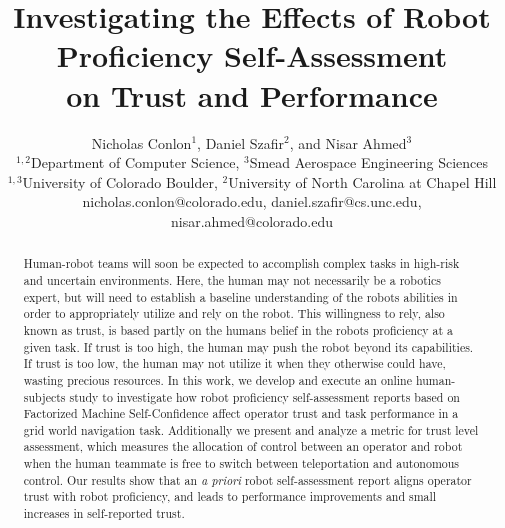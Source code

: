\documentclass[aaai]{article}
\begin{document}
\title{Investigating the Effects of Robot Proficiency Self-Assessment \\ on Trust and Performance}
\author{Nicholas Conlon$^{1}$, Daniel Szafir$^{2}$, and Nisar Ahmed$^{3}$\\
$^{1,2}$Department of Computer Science, $^{3}$Smead Aerospace Engineering Sciences\\
$^{1,3}$University of Colorado Boulder, $^{2}$University of North Carolina at Chapel Hill\\
nicholas.conlon@colorado.edu, daniel.szafir@cs.unc.edu, nisar.ahmed@colorado.edu\\
}
\newcommand{\nickComm}[1]{{\color{red}{ \textbf{NJC:} #1}}}
\newcommand{\brettComm}[1]{{\color{blue}{ \textbf{BWI:} #1}}}
\newcommand{\nisarComm}[1]{{\color{magenta}{ \textbf{NRA:} #1}}}

\maketitle
\thispagestyle{empty}
\pagestyle{empty}



\begin{abstract}
Human-robot teams will soon be expected to accomplish complex tasks in high-risk and uncertain environments. Here, the human may not necessarily be a robotics expert, but will need to establish a baseline understanding of the robots abilities in order to appropriately utilize and rely on the robot. This willingness to rely, also known as trust, is based partly on the humans belief in the robots proficiency at a given task. If trust is too high, the human may push the robot beyond its capabilities. If trust is too low, the human may not utilize it when they otherwise could have, wasting precious resources. In this work, we develop and execute an online human-subjects study to investigate how robot proficiency self-assessment reports based on Factorized Machine Self-Confidence affect operator trust and task performance in a grid world navigation task. Additionally we present and analyze a metric for trust level assessment, which measures the allocation of control between an operator and robot when the human teammate is free to switch between teleportation and autonomous control. Our results show that an \textit{a priori} robot self-assessment report aligns operator trust with robot proficiency, and leads to performance improvements and small increases in self-reported trust.
\end{abstract}
\end{document}
